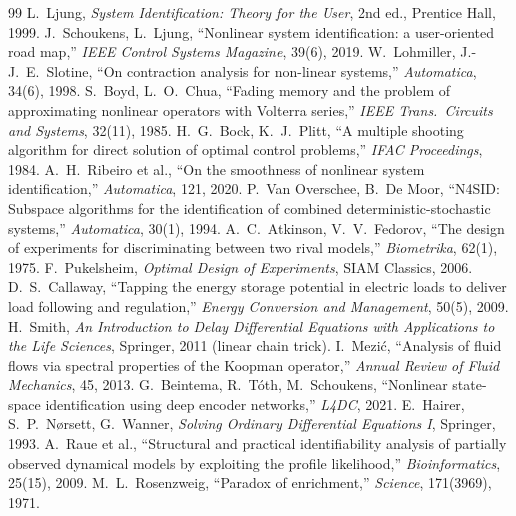 \documentclass[11pt]{article}
\theoremstyle{plain}
\theoremstyle{definition}
\theoremstyle{remark}
\begin{document}
\begin{thebibliography}{99}\small
{} L.~Ljung, \emph{System Identification: Theory for the User}, 2nd ed., Prentice Hall, 1999.
 J.~Schoukens, L.~Ljung, ``Nonlinear system identification: a user-oriented road map,'' \emph{IEEE Control Systems Magazine}, 39(6), 2019.
 W.~Lohmiller, J.-J.~E.~Slotine, ``On contraction analysis for non-linear systems,'' \emph{Automatica}, 34(6), 1998.
 S.~Boyd, L.~O.~Chua, ``Fading memory and the problem of approximating nonlinear operators with Volterra series,'' \emph{IEEE Trans.\ Circuits and Systems}, 32(11), 1985.
 H.~G.~Bock, K.~J.~Plitt, ``A multiple shooting algorithm for direct solution of optimal control problems,'' \emph{IFAC Proceedings}, 1984.
 A.~H.~Ribeiro et al., ``On the smoothness of nonlinear system identification,'' \emph{Automatica}, 121, 2020.
 P.~Van Overschee, B.~De Moor, ``N4SID: Subspace algorithms for the identification of combined deterministic-stochastic systems,'' \emph{Automatica}, 30(1), 1994.
 A.~C.~Atkinson, V.~V.~Fedorov, ``The design of experiments for discriminating between two rival models,'' \emph{Biometrika}, 62(1), 1975.
 F.~Pukelsheim, \emph{Optimal Design of Experiments}, SIAM Classics, 2006.
 D.~S.~Callaway, ``Tapping the energy storage potential in electric loads to deliver load following and regulation,'' \emph{Energy Conversion and Management}, 50(5), 2009.
 H.~Smith, \emph{An Introduction to Delay Differential Equations with Applications to the Life Sciences}, Springer, 2011 (linear chain trick).
 I.~Mezi\'c, ``Analysis of fluid flows via spectral properties of the Koopman operator,'' \emph{Annual Review of Fluid Mechanics}, 45, 2013.
 G.~Beintema, R.~T\'oth, M.~Schoukens, ``Nonlinear state-space identification using deep encoder networks,'' \emph{L4DC}, 2021.
 E.~Hairer, S.~P.~N\o rsett, G.~Wanner, \emph{Solving Ordinary Differential Equations I}, Springer, 1993.
 A.~Raue et al., ``Structural and practical identifiability analysis of partially observed dynamical models by exploiting the profile likelihood,'' \emph{Bioinformatics}, 25(15), 2009.
 M.~L.~Rosenzweig, ``Paradox of enrichment,'' \emph{Science}, 171(3969), 1971.
\end{thebibliography}
\end{document}
